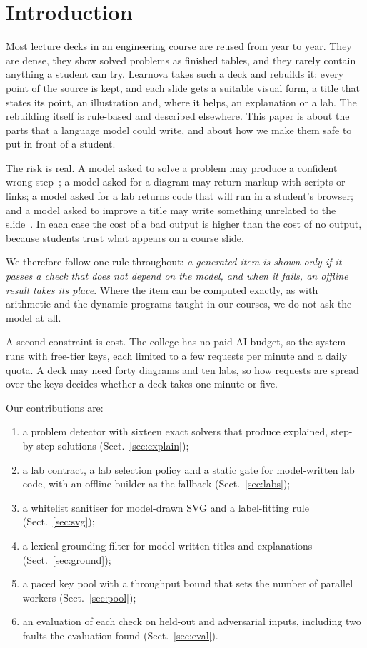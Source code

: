 \documentclass[runningheads]{llncs}
\begin{document}
\section{Introduction}
Most lecture decks in an engineering course are reused from year to year. They are dense, they show solved problems as
finished tables, and they rarely contain anything a student can try. Learnova takes such a deck and rebuilds it: every point of
the source is kept, and each slide gets a suitable visual form, a title that states its point, an illustration and, where it
helps, an explanation or a lab. The rebuilding itself is rule-based and described elsewhere. This paper is about the parts that
a language model could write, and about how we make them safe to put in front of a student.

The risk is real. A model asked to solve a problem may produce a confident wrong step~\cite{ji2023,kasneci2023}; a model asked
for a diagram may return markup with scripts or links; a model asked for a lab returns code that will run in a student's browser;
and a model asked to improve a title may write something unrelated to the slide~\cite{maynez2020}. In each case the cost of a bad
output is higher than the cost of no output, because students trust what appears on a course slide.

We therefore follow one rule throughout: \emph{a generated item is shown only if it passes a check that does not depend on the
model, and when it fails, an offline result takes its place}. Where the item can be computed exactly, as with arithmetic and the
dynamic programs taught in our courses, we do not ask the model at all.

A second constraint is cost. The college has no paid AI budget, so the system runs with free-tier keys, each limited to a few
requests per minute and a daily quota. A deck may need forty diagrams and ten labs, so how requests are spread over the keys
decides whether a deck takes one minute or five.

Our contributions are:
\begin{enumerate}
\item a problem detector with sixteen exact solvers that produce explained, step-by-step solutions (Sect.~\ref{sec:explain});
\item a lab contract, a lab selection policy and a static gate for model-written lab code, with an offline builder as the
fallback (Sect.~\ref{sec:labs});
\item a whitelist sanitiser for model-drawn SVG and a label-fitting rule (Sect.~\ref{sec:svg});
\item a lexical grounding filter for model-written titles and explanations (Sect.~\ref{sec:ground});
\item a paced key pool with a throughput bound that sets the number of parallel workers (Sect.~\ref{sec:pool});
\item an evaluation of each check on held-out and adversarial inputs, including two faults the evaluation found
(Sect.~\ref{sec:eval}).
\end{enumerate}
\end{document}
